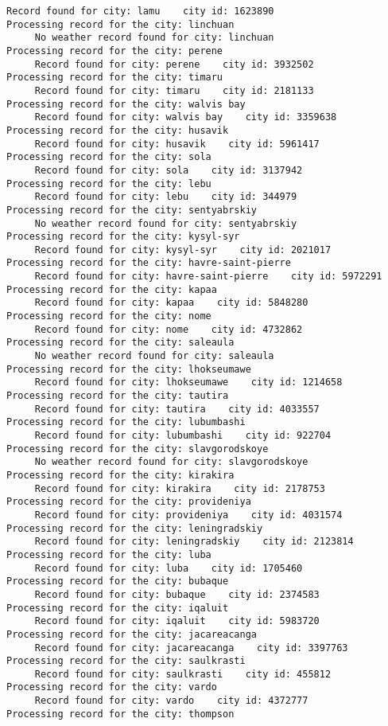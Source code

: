 \documentclass[11pt]{article}
\begin{document}
\begin{Verbatim}[commandchars=\\\{\}]
     Record found for city: lamu    city id: 1623890
Processing record for the city: linchuan
     No weather record found for city: linchuan
Processing record for the city: perene
     Record found for city: perene    city id: 3932502
Processing record for the city: timaru
     Record found for city: timaru    city id: 2181133
Processing record for the city: walvis bay
     Record found for city: walvis bay    city id: 3359638
Processing record for the city: husavik
     Record found for city: husavik    city id: 5961417
Processing record for the city: sola
     Record found for city: sola    city id: 3137942
Processing record for the city: lebu
     Record found for city: lebu    city id: 344979
Processing record for the city: sentyabrskiy
     No weather record found for city: sentyabrskiy
Processing record for the city: kysyl-syr
     Record found for city: kysyl-syr    city id: 2021017
Processing record for the city: havre-saint-pierre
     Record found for city: havre-saint-pierre    city id: 5972291
Processing record for the city: kapaa
     Record found for city: kapaa    city id: 5848280
Processing record for the city: nome
     Record found for city: nome    city id: 4732862
Processing record for the city: saleaula
     No weather record found for city: saleaula
Processing record for the city: lhokseumawe
     Record found for city: lhokseumawe    city id: 1214658
Processing record for the city: tautira
     Record found for city: tautira    city id: 4033557
Processing record for the city: lubumbashi
     Record found for city: lubumbashi    city id: 922704
Processing record for the city: slavgorodskoye
     No weather record found for city: slavgorodskoye
Processing record for the city: kirakira
     Record found for city: kirakira    city id: 2178753
Processing record for the city: provideniya
     Record found for city: provideniya    city id: 4031574
Processing record for the city: leningradskiy
     Record found for city: leningradskiy    city id: 2123814
Processing record for the city: luba
     Record found for city: luba    city id: 1705460
Processing record for the city: bubaque
     Record found for city: bubaque    city id: 2374583
Processing record for the city: iqaluit
     Record found for city: iqaluit    city id: 5983720
Processing record for the city: jacareacanga
     Record found for city: jacareacanga    city id: 3397763
Processing record for the city: saulkrasti
     Record found for city: saulkrasti    city id: 455812
Processing record for the city: vardo
     Record found for city: vardo    city id: 4372777
Processing record for the city: thompson

\end{Verbatim}
\end{document}
